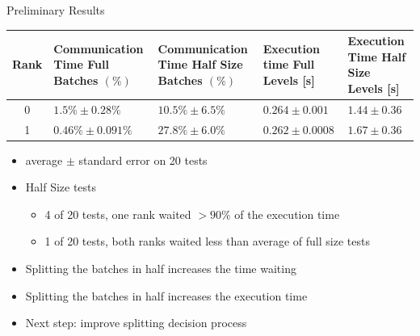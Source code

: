 \begin{frame}{Preliminary Results}
    \begin{tabular}{c|p{3.5cm}|p{3.5cm}|p{2.5cm}|p{2.5cm}}
        Rank & Communication Time Full Batches $(\%)$& Communication Time Half Size Batches $(\%)$  & Execution time Full Levels [s] & Execution Time Half Size Levels [s] \\
        \hline
        0 & $1.5\% \pm 0.28\%$ & $10.5\% \pm 6.5\%$ & $0.264\pm 0.001$ & $1.44 \pm 0.36$ \\
        1 & $0.46\% \pm 0.091\%$ & $27.8\% \pm 6.0\%$ & $0.262\pm 0.0008$ & $1.67 \pm 0.36$ \\
    \end{tabular}

\medskip
\begin{itemize}
    \item \alert{average $\pm$ standard error} on 20 tests
    \item Half Size tests
    \begin{itemize}
        \item 4 of 20 tests, one rank waited $>90\%$ of the execution time
        \item 1 of 20 tests, both ranks waited less than average of full size tests 
    \end{itemize}
\end{itemize}
    \bigskip
    
\begin{itemize}
    \item Splitting the batches in half \alert{increases} the time waiting
    \item Splitting the batches in half \alert{increases} the execution time
    \item \alert{Next step:} improve splitting decision process
\end{itemize}
\end{frame}

